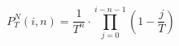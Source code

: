 \documentclass{standalone}
\begin{document}
\centering
\begin{minipage}{5cm}
	\[
		P^N_T(i, n)
		=
		\frac{1}{T^n}
		\cdot
		\prod_{j=0}^{i - n - 1}
		\left(1 - \frac{j}{T}\right)
	\]
\end{minipage}
\end{document}
